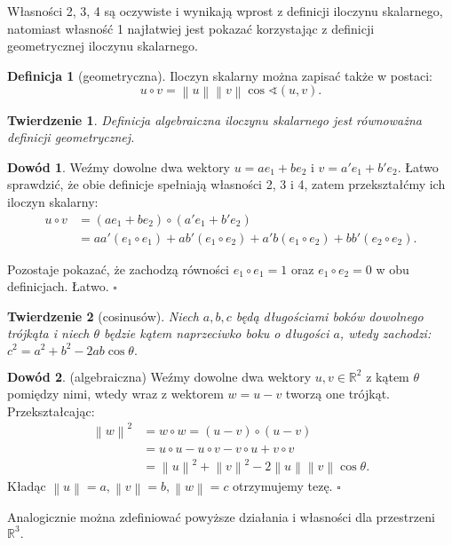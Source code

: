 \documentclass[12pt,a4paper]{article}
\newcommand{\norm}[1]{\left\lVert#1\right\rVert}
\newcommand{\RR}{\mathbb{R}}
\renewcommand{\qed}{$\square$}
\theoremstyle{plain}
\newtheorem{tw}{Twierdzenie}[section]
\theoremstyle{definition}
\theoremstyle{definition}
\newtheorem{df}{Definicja}[section]
\theoremstyle{definition}
\theoremstyle{definition}
\newtheorem*{dd}{Dowód}
\theoremstyle{definition}
\begin{document}
Własności 2, 3, 4 są oczywiste i wynikają wprost z definicji iloczynu skalarnego, natomiast własność 1 najłatwiej jest pokazać korzystając z definicji geometrycznej iloczynu skalarnego.

\begin{df}[geometryczna] Iloczyn skalarny można zapisać także w postaci: $$u \circ v = \norm{u}\norm{v}\cos\sphericalangle(u, v).$$ \end{df}

\begin{tw} Definicja algebraiczna iloczynu skalarnego jest równoważna definicji geometrycznej. \end{tw}

\begin{dd}
  Weźmy dowolne dwa wektory $u = ae_1 + be_2$ i $v = a'e_1 + b'e_2$. Łatwo sprawdzić, że obie definicje spełniają własności 2, 3 i 4, zatem przekształćmy ich iloczyn skalarny: \begin{align*}u \circ v &= (ae_1 + be_2) \circ (a'e_1 + b'e_2) \\ &= aa'(e_1 \circ e_1) + ab'(e_1 \circ e_2) + a'b(e_1 \circ e_2) + bb'(e_2 \circ e_2).\end{align*}

    Pozostaje pokazać, że zachodzą równości $e_1 \circ e_1 = 1$ oraz $e_1 \circ e_2 = 0$ w obu definicjach. Łatwo. \qed
\end{dd}

\begin{tw}[cosinusów]
  Niech $a,b,c$ będą długościami boków dowolnego trójkąta i niech $\theta$ będzie kątem naprzeciwko boku o długości $a$, wtedy zachodzi: $c^2 = a^2 + b^2 - 2ab\cos\theta.$
\end{tw}

\begin{dd}(algebraiczna)
  Weźmy dowolne dwa wektory $u,v\in\RR^2$ z kątem $\theta$ pomiędzy nimi, wtedy wraz z wektorem $w=u-v$ tworzą one trójkąt. Przekształcając: \begin{align*} \norm{w}^2 &= w \circ w = (u-v)\circ(u-v) \\ &= u \circ u - u \circ v - v \circ u + v \circ v \\ &= \norm{u}^2 + \norm{v}^2 - 2\norm{u}\norm{v}\cos\theta. \end{align*}
  Kładąc $\norm{u}=a, \norm{v}=b, \norm{w}=c$ otrzymujemy tezę. \qed
\end{dd}

Analogicznie można zdefiniować powyższe działania i własności dla przestrzeni $\RR^3.$
\end{document}
